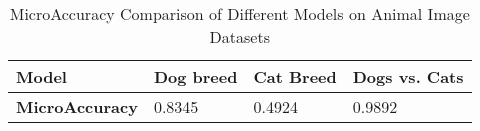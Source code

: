 \begin{table}[h]
\centering
\begin{tabular}{|l|l|l|l|}
\hline
\textbf{Model}         & \textbf{Dog breed} & \textbf{Cat Breed} & \textbf{Dogs vs. Cats} \\ \hline
\textbf{MicroAccuracy} & 0.8345             & 0.4924             & 0.9892                 \\ \hline
\end{tabular}
\caption{MicroAccuracy Comparison of Different Models on Animal Image Datasets}
\label{table:model_accuracy}
\end{table}
